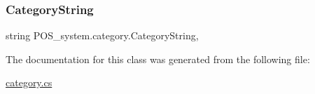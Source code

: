 \subsubsection{\texorpdfstring{Category\+String}{CategoryString}}
{\footnotesize\ttfamily string P\+O\+S\+\_\+system.\+category.\+Category\+String\hspace{0.3cm}{\ttfamily [get]}, {\ttfamily [set]}}



The documentation for this class was generated from the following file\+:\begin{DoxyCompactItemize}
\item 
\mbox{\hyperlink{category_8cs}{category.\+cs}}\end{DoxyCompactItemize}
